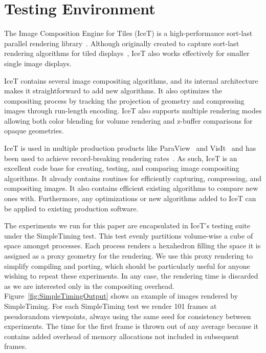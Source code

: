 \documentclass{acm_proc_article-sp}
\newcommand*{\lcite}[1]{~\cite{#1}}
\begin{document}
\section{Testing Environment}
\label{sec:TestingEnvironment}

The Image Composition Engine for Tiles (IceT) is a high-performance
sort-last parallel rendering library\lcite{IceT}.  Although originally
created to capture sort-last rendering algorithms for tiled
displays\lcite{Moreland2001}, IceT also works effectively for smaller
single image displays.

IceT contains several image compositing algorithms, and its internal
architecture makes it straightforward to add new algorithms.  It also
optimizes the compositing process by tracking the projection of geometry
and compressing images through run-length encoding.  IceT also supports
multiple rendering modes allowing both color blending for volume rendering
and z-buffer comparisons for opaque geometries.

IceT is used in multiple production products like ParaView\lcite{ParaView}
and VisIt\lcite{VisIt} and has been used to achieve record-breaking
rendering rates\lcite{Higham2005}.  As such, IceT is an excellent code base
for creating, testing, and comparing image compositing algorithms.  It
already contains routines for efficiently capturing, compressing, and
compositing images.  It also contains efficient existing algorithms to
compare new ones with.  Furthermore, any optimizations or new algorithms
added to IceT can be applied to existing production software.

The experiments we run for this paper are encapsulated in IceT's testing
suite under the SimpleTiming test.  This test evenly partitions volume-wise
a cube of space amongst processes.  Each process renders a hexahedron
filling the space it is assigned as a proxy geometry for the rendering.  We
use this proxy rendering to simplify compiling and porting, which should be
particularly useful for anyone wishing to repeat these experiments.  In any
case, the rendering time is discarded as we are interested only in the
compositing overhead.  Figure~\ref{fig:SimpleTimingOutput} shows an example
of images rendered by SimpleTiming.  For each SimpleTiming test we render
101 frames at pseudorandom viewpoints, always using the same seed for
consistency between experiments.  The time for the first frame is thrown
out of any average because it contains added overhead of memory allocations
not included in subsequent frames.
\end{document}

